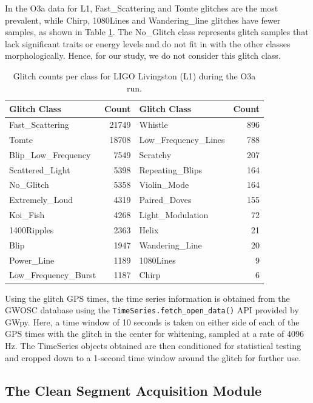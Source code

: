\documentclass[12pt]{article}
\begin{document}
\medskip
\noindent In the O3a data for L1, Fast\_Scattering and Tomte glitches are the most prevalent, while Chirp, 1080Lines and Wandering\_line glitches have fewer samples, as shown in Table \ref{tab:glitch_classes}. The No\_Glitch class represents glitch samples that lack significant traits or energy levels and do not fit in with the other classes morphologically. Hence, for our study, we do not consider this glitch class.

\begin{table}[H]
    \centering
    \begin{tabular}{lr|lr}
    \toprule
    Glitch Class & Count & Glitch Class & Count \\
    \midrule
    Fast\_Scattering & 21749 & Whistle & 896 \\
    Tomte & 18708 & Low\_Frequency\_Lines & 788\\
    Blip\_Low\_Frequency & 7549 & Scratchy & 207 \\
    Scattered\_Light & 5398 & Repeating\_Blips & 164 \\
    No\_Glitch & 5358 & Violin\_Mode & 164 \\
    Extremely\_Loud & 4319 & Paired\_Doves & 155 \\
    Koi\_Fish & 4268 & Light\_Modulation & 72 \\
    1400Ripples & 2363 & Helix & 21 \\
    Blip & 1947 & Wandering\_Line & 20 \\
    Power\_Line & 1189 & 1080Lines & 9 \\
    Low\_Frequency\_Burst & 1187 & Chirp & 6 \\
    \bottomrule
    \end{tabular}
    \caption{Glitch counts per class for LIGO Livingston (L1) during the O3a run.}
    \label{tab:glitch_classes}
\end{table}

\pagebreak
\noindent Using the glitch GPS times, the time series information is obtained from the GWOSC database using the \texttt{TimeSeries.fetch\_open\_data()} API provided by GWpy. Here, a time window of 10 seconds is taken on either side of each of the GPS times with the glitch in the center for whitening, sampled at a rate of 4096 Hz. The TimeSeries objects obtained are then conditioned for statistical testing and cropped down to a 1-second time window around the glitch for further use.

\subsection{The Clean Segment Acquisition Module}\label{Cleandata}
\end{document}
